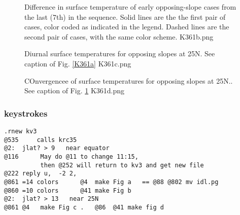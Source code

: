 \begin{figure}[!ht] 
\caption[Valley convergence]{Difference in surface temperature of early opposing-slope cases from the last (7th) in the sequence. Solid lines are the the first pair of cases, color coded as indicated in the legend. Dashed lines are the second pair of cases, with the same color scheme.
\label{K361b}  K361b.png }
\end{figure} 

\begin{figure}[!ht] 
\caption[Valley temperatures 25N]{Diurnal surface temperatures for opposing slopes at 25N. See caption of Fig.  \ref{K361a}
\label{K361c}  K361c.png  }
\end{figure} 

\begin{figure}[!ht] 
\caption[Valley convergence 25N]{COnvergencee of surface temperatures for opposing slopes at 25N.. See caption of Fig.  \ref{K361b}
\label{K361d}  K361d.png  }
\end{figure} 

\subsubsection{keystrokes} %
\vspace{-3.mm} 
\begin{verbatim}
.rnew kv3
@535     calls krc35
@2:  jlat? > 9   near equator
@116      May do @11 to change 11:15, 
          then @252 will return to kv3 and get new file   
@222 reply u,  -2 2, 
@861 =14 colors      @4  make Fig a   == @88 @802 mv idl.pg
@860 =10 colors      @41 make Fig b 
@2:  jlat? > 13   near 25N
@861 @4   make Fig c .   @86  @41 make fig d


\end{verbatim}  
